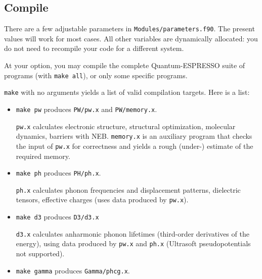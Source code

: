 \documentclass[12pt,a4paper]{article}
\begin{document}
\subsection{Compile}

There are a few adjustable parameters in
\texttt{Modules/parameters.f90}.
The present values will work for most cases.  All other variables are
dynamically allocated: you do not need to recompile your code for a
different system.

At your option, you may compile the complete Quantum-ESPRESSO suite of
programs (with \texttt{make all}), or only some specific programs.

\texttt{make} with no arguments yields a list of valid compilation
targets.
Here is a list:

\begin{itemize}
  \item
    \texttt{make pw} produces \texttt{PW/pw.x} and
    \texttt{PW/memory.x}.

    \texttt{pw.x} calculates electronic structure, structural
    optimization, molecular dynamics, barriers with NEB.
    \texttt{memory.x} is an auxiliary program that checks the input of
    \texttt{pw.x} for correctness and yields a rough (under-) estimate
    of the required memory.
  \item
    \texttt{make ph} produces \texttt{PH/ph.x}.

    \texttt{ph.x} calculates phonon frequencies and displacement
    patterns, dielectric tensors, effective charges (uses data
    produced by \texttt{pw.x}).
  \item
    \texttt{make d3} produces \texttt{D3/d3.x}

    \texttt{d3.x} calculates anharmonic phonon lifetimes (third-order
    derivatives of the energy), using data produced by \texttt{pw.x}
    and \texttt{ph.x} (Ultrasoft pseudopotentials not supported).
  \item
    \texttt{make gamma} produces \texttt{Gamma/phcg.x}.


\end{itemize}
\end{document}

